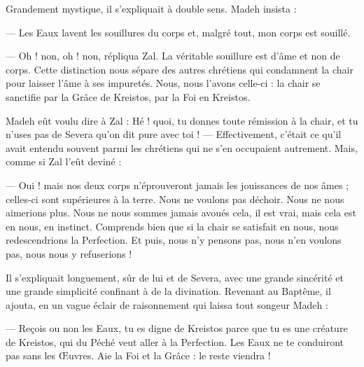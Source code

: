 \documentclass[a4paper, 11pt, oneside, polutonikogreek, french]{article}
\begin{document}
Grandement mystique, il s'expliquait à double sens. Madeh insista :

--- Les Eaux lavent les souillures du corps et, malgré tout, mon corps est souillé.

--- Oh ! non, oh ! non, répliqua Zal. La véritable souillure est d'âme et non de corps. Cette distinction nous sépare des autres chrétiens qui condamnent la chair pour laisser l'âme à ses impuretés. Nous, nous l’avons celle-ci : la chair se sanctifie par la Grâce de Kreistos, par la Foi en Kreistos.

Madeh eût voulu dire à Zal : Hé ! quoi, tu donnes toute rémission à la chair, et tu n'uses pas de Severa qu'on dit pure avec toi ! --- Effectivement, c'était ce qu'il avait entendu souvent parmi les chrétiens qui ne s'en occupaient autrement. Mais, comme si Zal l'eût deviné :

--- Oui ! mais nos deux corps n'éprouveront jamais les jouissances de nos âmes ; celles-ci sont supérieures à la terre. Nous ne voulons pas déchoir. Nous ne nous aimerions plus. Nous ne nous sommes jamais avoués cela, il est vrai, mais cela est en nous, en instinct. Comprends bien que si la chair se satisfait en nous, nous redescendrions la Perfection. Et puis, nous n'y pensons pas, nous n'en voulons pas, nous nous y refuserions !

Il s'expliquait longuement, sûr de lui et de Severa, avec une grande sincérité et une grande simplicité confinant à de la divination. Revenant au Baptême, il ajouta, en un vague éclair de raisonnement qui laissa tout songeur Madeh :

--- Reçois ou non les Eaux, tu es digne de Kreistos parce que tu es une créature de Kreistos, qui du Péché veut aller à la Perfection. Les Eaux ne te conduiront pas sans les Œuvres. Aie la Foi et la Grâce : le reste viendra !
\clearpage
\subsection{}
\end{document}
